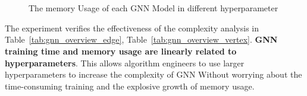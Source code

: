 \begin{figure}
	\centering
    \\
    \\
    \caption{The memory Usage of each GNN Model in different hyperparameter}
	\label{fig:exp_hyperparameter_memory_usage}
\end{figure}

The experiment verifies the effectiveness of the complexity analysis in Table~\ref{tab:gnn_overview_edge}, Table~\ref{tab:gnn_overview_vertex}. \textbf{GNN training time and memory usage are linearly related to hyperparameters}.
This allows algorithm engineers to use larger hyperparameters to increase the complexity of GNN Without worrying about the time-consuming training and the explosive growth of memory usage.

